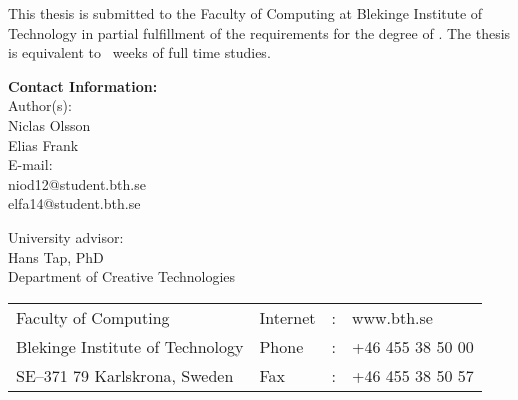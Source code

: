 \documentclass[a4paper,oneside]{bth}
\begin{document}
{\pagestyle{empty}
\changepage{5cm}{1cm}{-0.5cm}{-0.5cm}{}{-2cm}{}{}{}
\noindent
{\small
This thesis is submitted to the Faculty of Computing at Blekinge Institute
of Technology in partial fulfillment of the requirements for the degree of
\thesisDegree. The thesis is equivalent to \thesisWeeks\ 
weeks of full time studies.
}

\vspace{15cm}

\noindent
\textbf{Contact Information:} \\
Author(s): \\
Niclas Olsson \\
Elias Frank \\
E-mail:\\
niod12@student.bth.se \\
elfa14@student.bth.se

\vspace{2cm}

\noindent
University advisor: \\
Hans Tap, PhD \\
Department of Creative Technologies


\vspace*{\fill}

\noindent
\begin{tabular}{@{}p{} l c l}
Faculty of Computing             & Internet & : & www.bth.se \\
Blekinge Institute of Technology & Phone    & : & +46 455 38 50 00 \\
SE--371 79 Karlskrona, Sweden    & Fax      & : & +46 455 38 50 57 \\
\end{tabular}
\clearpage
} %

\setcounter{page}{1}
\end{document}
